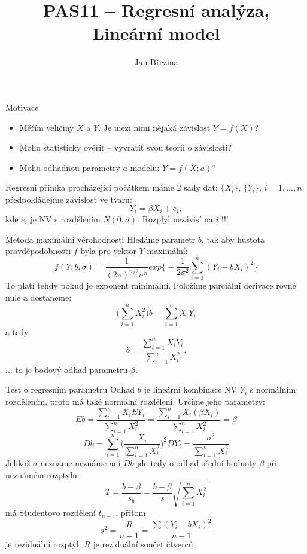 \documentclass[smaller]{beamer}
\title{PAS11 -- Regresní analýza, Lineární model}
\author{Jan B\v rezina}
\institute %
{
  Technical University of Liberec
}
\begin{document}
\begin{frame}
  \titlepage
\end{frame}

\def\df{\usebeamercolor[fg]{my red}\it}

\begin{frame}{Motivace}
 \begin{itemize}
  \item Měřím veličiny $X$ a $Y$. Je mezi nimi nějaká závislost $Y = f(X)$?
  \item Mohu statisticky ověřit -- vyvrátit svou teorii o závislosti?
  \item Mohu odhadnou parametry $a$ modelu: $Y= f(X; a)$?
 \end{itemize}
\end{frame}

\begin{frame}{Regresní přímka procházející počátkem}
 máme 2 sady dat: $\{X_i\}$, $\{Y_i\}$, $i=1,\dots,n$
 předpokládejme závislost ve tvaru:
 \[
    Y_i = \beta X_i + e_i,
 \]
 kde $e_i$ je NV s rozdělením $N(0,\sigma)$. Rozplyl nezávisí na $i$ !!! 
 
\end{frame}

\begin{frame}{Metoda maximální věrohodnosti}
 Hledáme parametr $b$, tak aby hustota pravděpodobnosti $f$ byla pro vektor $Y$ maximální:
 \[
   f(Y;b,\sigma) = \frac{1}{(2\pi)^{n/2}\sigma^n} exp\Big\{ -\frac{1}{2\sigma^2} \sum_{i=1}^{n} (Y_i - b X_i)^2 \Big\}
 \]
 To platí tehdy pokud je exponent minimální. Položíme parciální derivace rovné nule a dostaneme:
 \[
    \big(\sum_{i=1}^n X_i^2\big) b = \sum_{i=1}^n X_iY_i 
 \]
 a tedy 
\[ 
   b = \frac{\sum_{i=1}^n X_iY_i}{\sum_{i=1}^n X_i^2}.
\]
... to je bodový odhad parametru $\beta$.
\end{frame}

\begin{frame}{Test o regresním parametru}
Odhad $b$ je lineární kombinace NV $Y_i$ s normálním rozdělením, proto má také normální rozdělení. Určíme jeho parametry:
\[
 E b = \frac{\sum_{i=1}^n X_i E Y_i}{\sum_{i=1}^n X_i^2} = \frac{\sum_{i=1}^n X_i (\beta X_i)}{\sum_{i=1}^n X_i^2} =\beta
\]
\[
 D b = \sum_{i=1}^n \Big(\frac{X_i}{\sum_{i=1}^n X_i^2}\Big)^2 D Y_i = \frac{\sigma^2}{{\sum_{i=1}^n X_i^2}}
\]
Jelikož $\sigma$ neznáme neznáme ani $D b$ jde tedy o odhad sřední hodnoty $\beta$ při neznámém rozptylu:
\[
 T = \frac{b-\beta}{s_b} = \frac{b - \beta}{s} \sqrt{\sum_{i=1}^n X_i^2}
\]
má Studentovo rozdělení $t_{n-1}$, přitom
\[
 s^2 = \frac{R}{n-1} = \frac{\sum (Y_i - b X_i)^2}{n-1}
\]
je reziduální rozptyl, $R$ je reziduální součet čtverců. 
\end{frame}
\end{document}
